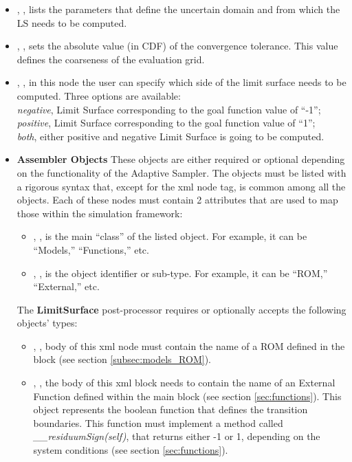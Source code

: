 \begin{itemize}
  \item {}, ,
  lists the parameters that define the uncertain domain and from which the LS
  needs to be computed.
  \item {}, , sets the absolute
  value (in CDF) of the convergence tolerance.
  This value defines the coarseness of the evaluation grid.
  \item {}, , in this node the user can specify
  which side of the limit surface needs to be computed. Three options are available:
  \\ \textit{negative},  Limit Surface corresponding to the goal function value of ``-1'';
  \\ \textit{positive}, Limit Surface corresponding to the goal function value of ``1'';
  \\ \textit{both}, either positive and negative Limit Surface is going to be computed.
  \item \textbf{Assembler Objects} These objects are either required or optional
  depending on the functionality of the Adaptive Sampler.
  The objects must be listed with a rigorous syntax that, except for the xml
  node tag, is common among all the objects.
  Each of these nodes must contain 2 attributes that are used to map those
  within the simulation framework:
   \begin{itemize}
    \item {}, , is the main
    ``class'' of the listed object.
    For example, it can be ``Models,'' ``Functions,'' etc.
    \item {}, , is the object
    identifier or sub-type.
    For example, it can be ``ROM,'' ``External,'' etc.
  \end{itemize}
  The \textbf{LimitSurface} post-processor requires or optionally accepts the
  following objects' types:
   \begin{itemize}
    \item {}, , body of this xml
    node must contain the name of a ROM defined in the  block
    (see section \ref{subsec:models_ROM}).
    \item {}, , the body of
    this xml block needs to contain the name of an External Function defined
    within the  main block (see section \ref{sec:functions}).
    This object represents the boolean function that defines the transition
    boundaries.
    This function must implement a method called
    \textit{\_\_residuumSign(self)}, that returns either -1 or 1, depending on
    the system conditions (see section \ref{sec:functions}).
    \end{itemize}
\end{itemize}

